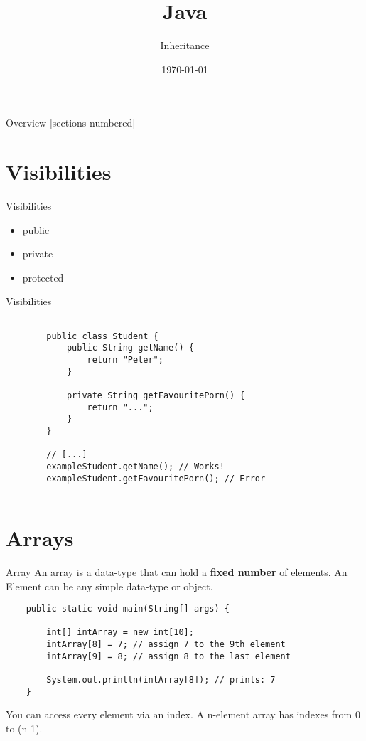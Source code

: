 


\title{Java}
\subtitle{Inheritance}
\date{\today}



\begin{frame}
	\titlepage
\end{frame}
\begin{frame}{Overview}
	[sections numbered]
	\tableofcontents
\end{frame}

\section{Visibilities}
\begin{frame}[fragile]{Visibilities}
	\begin{itemize}
		\item public
		\item private
		\item protected
	\end{itemize}
\end{frame}
	
\begin{frame}[fragile]{Visibilities}

	\begin{lstlisting}
	
		public class Student {
			public String getName() {
				return "Peter";
			}
			
			private String getFavouritePorn() {
				return "...";
			}
		}
	
		// [...]
		exampleStudent.getName(); // Works!
		exampleStudent.getFavouritePorn(); // Error
	
	\end{lstlisting}
	
\end{frame}


\section{Arrays}
\begin{frame}[fragile]{Array}
	An array is a data-type that can hold a \textbf{fixed number} of elements. 
	An Element can be any simple data-type or object.
	\begin{lstlisting}
	public static void main(String[] args) {
	
	    int[] intArray = new int[10];
	    intArray[8] = 7; // assign 7 to the 9th element
	    intArray[9] = 8; // assign 8 to the last element
	    
	    System.out.println(intArray[8]); // prints: 7
	}
	\end{lstlisting}
	You can access every element via an index. A n-element array has indexes from 0 to (n-1).
\end{frame}

